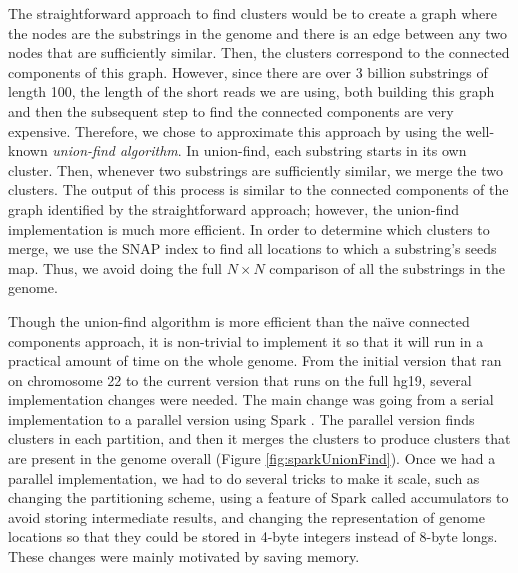 \documentclass[twocolumn,10pt]{article}
\begin{document}
The straightforward approach to find clusters would be to create a graph where the nodes are the substrings in the genome and there is an edge between any two nodes that are sufficiently similar.  Then, the clusters correspond to the connected components of this graph.  However, since there are over 3 billion substrings of length 100, the length of the short reads we are using, both building this graph and then the subsequent step to find the connected components are very expensive.  Therefore, we chose to approximate this approach by using the well-known \textit{union-find algorithm}.  In union-find, each substring starts in its own cluster.  Then, whenever two substrings are sufficiently similar, we merge the two clusters.  The output of this process is similar to the connected components of the graph identified by the straightforward approach; however, the union-find implementation is much more efficient.  In order to determine which clusters to merge, we use the SNAP index to find all locations to which a substring's seeds map.  Thus, we avoid doing the full \(N \times N\) comparison of all the substrings in the genome.

Though the union-find algorithm is more efficient than the na\"{\i}ve connected components approach, it is non-trivial to implement it so that it will run in a practical amount of time on the whole genome.  From the initial version that ran on chromosome 22 to the current version that runs on the full hg19, several implementation changes were needed.  The main change was going from a serial implementation to a parallel version using Spark \cite{Zaharia:2012}.  The parallel version finds clusters in each partition, and then it merges the clusters to produce clusters that are present in the genome overall (Figure \ref{fig:sparkUnionFind}).  Once we had a parallel implementation, we had to do several tricks to make it scale, such as changing the partitioning scheme, using a feature of Spark called accumulators to avoid storing intermediate results, and changing the representation of genome locations so that they could be stored in 4-byte integers instead of 8-byte longs.  These changes were mainly motivated by saving memory.
\end{document}
